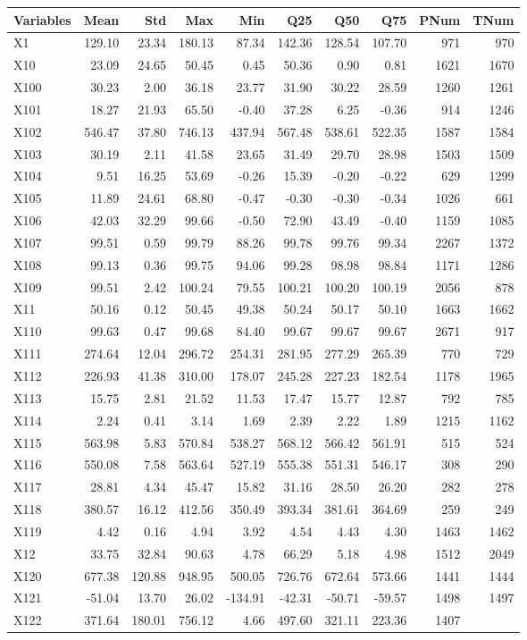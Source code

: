 \documentclass[
]{article}
\begin{document}
\begin{longtable}[]{@{}lrrrrrrrrr@{}}
\toprule
Variables & Mean & Std & Max & Min & Q25 & Q50 & Q75 & PNum &
TNum\tabularnewline
\midrule
\endhead
X1 & 129.10 & 23.34 & 180.13 & 87.34 & 142.36 & 128.54 & 107.70 & 971 &
970\tabularnewline
X10 & 23.09 & 24.65 & 50.45 & 0.45 & 50.36 & 0.90 & 0.81 & 1621 &
1670\tabularnewline
X100 & 30.23 & 2.00 & 36.18 & 23.77 & 31.90 & 30.22 & 28.59 & 1260 &
1261\tabularnewline
X101 & 18.27 & 21.93 & 65.50 & -0.40 & 37.28 & 6.25 & -0.36 & 914 &
1246\tabularnewline
X102 & 546.47 & 37.80 & 746.13 & 437.94 & 567.48 & 538.61 & 522.35 &
1587 & 1584\tabularnewline
X103 & 30.19 & 2.11 & 41.58 & 23.65 & 31.49 & 29.70 & 28.98 & 1503 &
1509\tabularnewline
X104 & 9.51 & 16.25 & 53.69 & -0.26 & 15.39 & -0.20 & -0.22 & 629 &
1299\tabularnewline
X105 & 11.89 & 24.61 & 68.80 & -0.47 & -0.30 & -0.30 & -0.34 & 1026 &
661\tabularnewline
X106 & 42.03 & 32.29 & 99.66 & -0.50 & 72.90 & 43.49 & -0.40 & 1159 &
1085\tabularnewline
X107 & 99.51 & 0.59 & 99.79 & 88.26 & 99.78 & 99.76 & 99.34 & 2267 &
1372\tabularnewline
X108 & 99.13 & 0.36 & 99.75 & 94.06 & 99.28 & 98.98 & 98.84 & 1171 &
1286\tabularnewline
X109 & 99.51 & 2.42 & 100.24 & 79.55 & 100.21 & 100.20 & 100.19 & 2056 &
878\tabularnewline
X11 & 50.16 & 0.12 & 50.45 & 49.38 & 50.24 & 50.17 & 50.10 & 1663 &
1662\tabularnewline
X110 & 99.63 & 0.47 & 99.68 & 84.40 & 99.67 & 99.67 & 99.67 & 2671 &
917\tabularnewline
X111 & 274.64 & 12.04 & 296.72 & 254.31 & 281.95 & 277.29 & 265.39 & 770
& 729\tabularnewline
X112 & 226.93 & 41.38 & 310.00 & 178.07 & 245.28 & 227.23 & 182.54 &
1178 & 1965\tabularnewline
X113 & 15.75 & 2.81 & 21.52 & 11.53 & 17.47 & 15.77 & 12.87 & 792 &
785\tabularnewline
X114 & 2.24 & 0.41 & 3.14 & 1.69 & 2.39 & 2.22 & 1.89 & 1215 &
1162\tabularnewline
X115 & 563.98 & 5.83 & 570.84 & 538.27 & 568.12 & 566.42 & 561.91 & 515
& 524\tabularnewline
X116 & 550.08 & 7.58 & 563.64 & 527.19 & 555.38 & 551.31 & 546.17 & 308
& 290\tabularnewline
X117 & 28.81 & 4.34 & 45.47 & 15.82 & 31.16 & 28.50 & 26.20 & 282 &
278\tabularnewline
X118 & 380.57 & 16.12 & 412.56 & 350.49 & 393.34 & 381.61 & 364.69 & 259
& 249\tabularnewline
X119 & 4.42 & 0.16 & 4.94 & 3.92 & 4.54 & 4.43 & 4.30 & 1463 &
1462\tabularnewline
X12 & 33.75 & 32.84 & 90.63 & 4.78 & 66.29 & 5.18 & 4.98 & 1512 &
2049\tabularnewline
X120 & 677.38 & 120.88 & 948.95 & 500.05 & 726.76 & 672.64 & 573.66 &
1441 & 1444\tabularnewline
X121 & -51.04 & 13.70 & 26.02 & -134.91 & -42.31 & -50.71 & -59.57 &
1498 & 1497\tabularnewline
X122 & 371.64 & 180.01 & 756.12 & 4.66 & 497.60 & 321.11 & 223.36 & 1407

\end{longtable}
\end{document}

